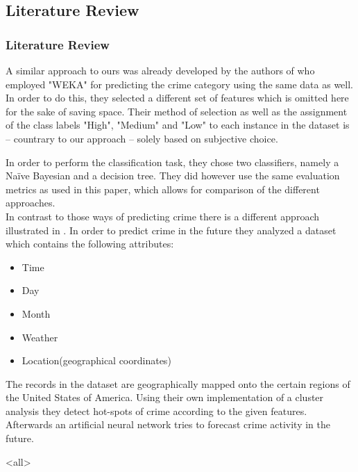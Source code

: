 \mode*
\begin{frame}
	\section{Literature Review}
	\frametitle{Literature Review}
\end{frame}

A similar approach to ours was already developed by the authors of
\cite{indian} who employed "WEKA" for predicting the crime category
using the same data as well. In order to do this, they selected a
different set of features which is omitted here for the sake of saving
space. Their method of selection as well as the assignment of the
class labels "High", "Medium" and "Low" to each instance in the
dataset is -- countrary to our approach -- solely based on subjective
choice.

In order to perform the classification task, they chose two
classifiers, namely a Na\"ive Bayesian and a decision tree. They did
however use the same evaluation metrics as used in this paper, which
allows for comparison of the different approaches.\\


\noindent In contrast to those ways of predicting crime there is a
different approach illustrated in \cite{forecast}. In order to predict
crime in the future they analyzed a dataset which contains the
following attributes:
\begin{itemize}
	\setlength{\itemsep}{-2pt}
	\item Time
	\item Day
	\item Month
	\item Weather
	\item Location(geographical coordinates) 
\end{itemize}
The records in the dataset are geographically mapped onto the certain
regions of the United States of America. Using their own
implementation of a cluster analysis they detect hot-spots of crime
according to the given features. Afterwards an artificial neural
network tries to forecast crime activity in the future.


\mode<all>